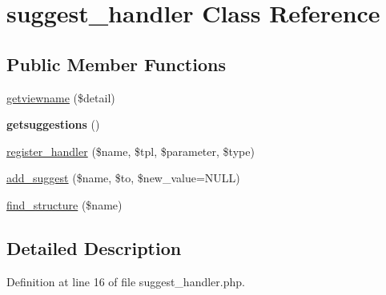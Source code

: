 \hypertarget{classsuggest__handler}{\section{suggest\-\_\-handler Class Reference}
\label{classsuggest__handler}
}
\subsection*{Public Member Functions}
\begin{DoxyCompactItemize}
\item 
\hyperlink{classsuggest__handler_a579df011177c3034a8e4d47707f31e55}{getviewname} (\$detail)
\item 
\hypertarget{classsuggest__handler_ae7f8d41304727fb1e7af3010996d88b2}{{\bfseries getsuggestions} ()}\label{classsuggest__handler_ae7f8d41304727fb1e7af3010996d88b2}

\item 
\hyperlink{classsuggest__handler_a23c3431f12e1169890240caee1881184}{register\-\_\-handler} (\$name, \$tpl, \$parameter, \$type)
\item 
\hyperlink{classsuggest__handler_a9f5bb474e7d61f299bfb1d8a51075ead}{add\-\_\-suggest} (\$name, \$to, \$new\-\_\-value=N\-U\-L\-L)
\item 
\hyperlink{classsuggest__handler_abd64d023e04b128c6bbdd1346592168f}{find\-\_\-structure} (\$name)
\end{DoxyCompactItemize}


\subsection{Detailed Description}


Definition at line 16 of file suggest\-\_\-handler.\-php.




